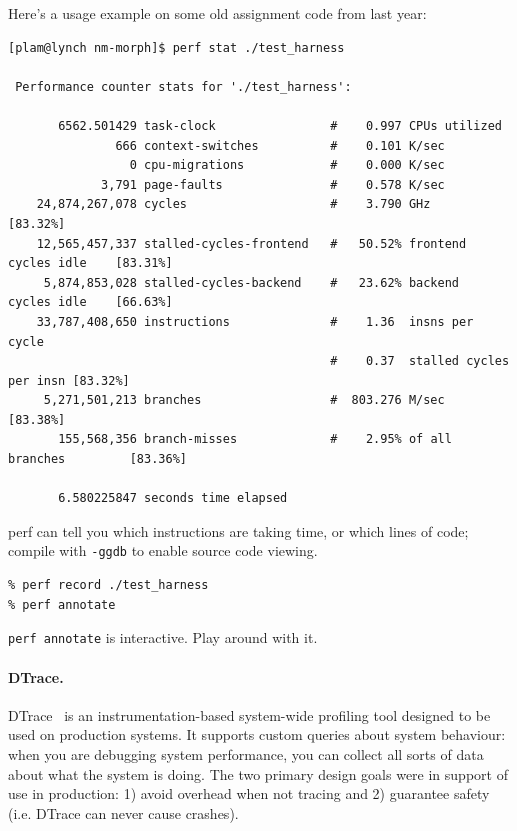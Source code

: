 \documentclass[a4paper]{report}
\begin{document}
\noindent
Here's a usage example on some old assignment code from last year:
\begin{lstlisting}[basicstyle=\scriptsize]
[plam@lynch nm-morph]$ perf stat ./test_harness

 Performance counter stats for './test_harness':

       6562.501429 task-clock                #    0.997 CPUs utilized          
               666 context-switches          #    0.101 K/sec                  
                 0 cpu-migrations            #    0.000 K/sec                  
             3,791 page-faults               #    0.578 K/sec                  
    24,874,267,078 cycles                    #    3.790 GHz                     [83.32%]
    12,565,457,337 stalled-cycles-frontend   #   50.52% frontend cycles idle    [83.31%]
     5,874,853,028 stalled-cycles-backend    #   23.62% backend  cycles idle    [66.63%]
    33,787,408,650 instructions              #    1.36  insns per cycle        
                                             #    0.37  stalled cycles per insn [83.32%]
     5,271,501,213 branches                  #  803.276 M/sec                   [83.38%]
       155,568,356 branch-misses             #    2.95% of all branches         [83.36%]

       6.580225847 seconds time elapsed
\end{lstlisting} %

\noindent
perf can tell you which instructions are taking time, or which lines
of code; compile with {\tt -ggdb} to enable source code viewing.

\begin{lstlisting}
% perf record ./test_harness
% perf annotate
\end{lstlisting}

\noindent
{\tt perf annotate} is interactive. Play around with it.

\paragraph{DTrace.} 
DTrace~\cite{Cantrill:2004:DIP:1247415.1247417} is an instrumentation-based
system-wide profiling tool designed to be used on production
systems. It supports custom queries about system behaviour: when you
are debugging system performance, you can collect all sorts of data
about what the system is doing. The two primary design goals were in
support of use in production: 1) avoid overhead when not tracing and
2) guarantee safety (i.e. DTrace can never cause crashes).
\end{document}
